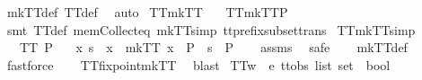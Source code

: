 \ mkTT{}{\isacharunderscore}def\ TT{}{\isacharunderscore}def\ \isamarkupfalse%
\ auto%
\endisatagproof
{\isafoldproof}%
%
\isadelimproof
\isanewline
%
\endisadelimproof
\isanewline
{}\isamarkupfalse%
\ TT{}{\isacharunderscore}mkTT{}{\isacharcolon}\isanewline
\ \ \ {\isachardoublequoteopen}TT{}{\isacharparenleft}mkTT{}{\isacharparenleft}P{\isacharparenright}{\isacharparenright}{\isachardoublequoteclose}\isanewline
%
\isadelimproof
\ \ %
\endisadelimproof
%
\isatagproof
{}\isamarkupfalse%
\ {\isacharparenleft}smt\ TT{}{\isacharunderscore}def\ mem{\isacharunderscore}Collect{\isacharunderscore}eq\ mkTT{}{\isacharunderscore}simp\ tt{\isacharunderscore}prefix{\isacharunderscore}subset{\isacharunderscore}trans{\isacharparenright}%
\endisatagproof
{\isafoldproof}%
%
\isadelimproof
\isanewline
%
\endisadelimproof
\isanewline
{}\isamarkupfalse%
\ TT{}{\isacharunderscore}mkTT{}{\isacharunderscore}simp{\isacharcolon}\isanewline
\ \ \ {\isachardoublequoteopen}TT{}\ P{\isachardoublequoteclose}\isanewline
\ \ \ {\isachardoublequoteopen}{\isacharparenleft}{\isasymexists}x{\isachardot}\ s\ {\isasymin}\ x\ {\isasymand}\ {\isacharparenleft}mkTT{}\ x{\isacharparenright}\ {\isasymsubseteq}\ P{\isacharparenright}\ {\isacharequal}\ {\isacharparenleft}s\ {\isasymin}\ P{\isacharparenright}{\isachardoublequoteclose}\isanewline
%
\isadelimproof
\ \ %
\endisadelimproof
%
\isatagproof
{}\isamarkupfalse%
\ assms\ \isamarkupfalse%
\ safe\isanewline
\ \ \isamarkupfalse%
\ mkTT{}{\isacharunderscore}def\ \isamarkupfalse%
\ fastforce\isanewline
\ \ \isamarkupfalse%
\ TT{}{\isacharunderscore}fixpoint{\isacharunderscore}mkTT{}\ \isamarkupfalse%
\ blast%
\endisatagproof
{\isafoldproof}%
%
\isadelimproof
\isanewline
%
\endisadelimproof
\isanewline
{}\isamarkupfalse%
\ TT{}w\ {\isacharcolon}{\isacharcolon}\ {\isachardoublequoteopen}{\isacharprime}e\ ttobs\ list\ set\ {\isasymRightarrow}\ bool{\isachardoublequoteclose}\ \isanewline
